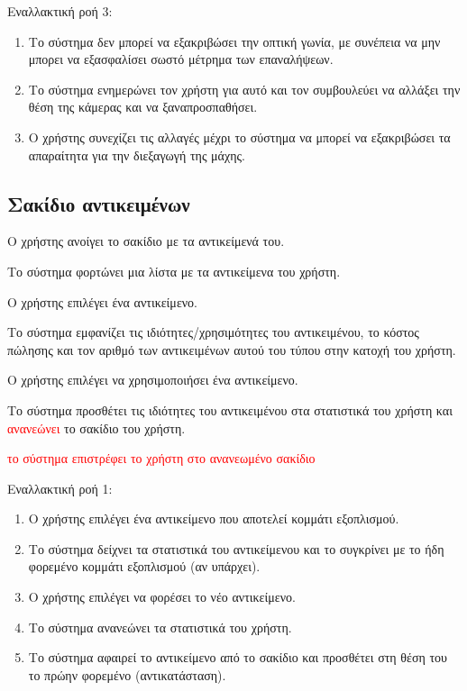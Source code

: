 Εναλλακτική ροή 3:
\begin{enumerate}[label=8.\alph*.,ref=8.\alph*]
\item Το σύστημα δεν μπορεί να εξακριβώσει την οπτική γωνία, με συνέπεια να μην μπορει να εξασφαλίσει σωστό μέτρημα των επαναλήψεων.
\item Το σύστημα ενημερώνει τον χρήστη για αυτό και τον συμβουλεύει να αλλάξει την θέση της κάμερας και να ξαναπροσπαθήσει. 
\item Ο χρήστης συνεχίζει τις αλλαγές μέχρι το σύστημα να μπορεί να εξακριβώσει τα απαραίτητα για την διεξαγωγή της μάχης.
\end{enumerate}

\newpage
\subsection{Σακίδιο αντικειμένων}
\label{sec:backpack}
\begin{enumerate}
\item Ο χρήστης ανοίγει το σακίδιο με τα αντικείμενά του.
\item Το σύστημα φορτώνει μια λίστα με τα αντικείμενα του χρήστη.
\item Ο χρήστης επιλέγει ένα αντικείμενο.
\item Το σύστημα εμφανίζει τις ιδιότητες/χρησιμότητες του αντικειμένου, το κόστος πώλησης και τον αριθμό των αντικειμένων αυτού του τύπου στην κατοχή του χρήστη.
\item Ο χρήστης επιλέγει να χρησιμοποιήσει ένα αντικείμενο.
\item Το σύστημα προσθέτει τις ιδιότητες του αντικειμένου στα στατιστικά του χρήστη και \textcolor{red}{ ανανεώνει }το σακίδιο του χρήστη.
\textcolor{red} { \item το σύστημα επιστρέφει το χρήστη στο ανανεωμένο σακίδιο}
\end{enumerate}

Εναλλακτική ροή 1:
\begin{enumerate}[label=3.\alph*.,ref=3.\alph*]
\item Ο χρήστης επιλέγει ένα αντικείμενο που αποτελεί κομμάτι εξοπλισμού.
\item Το σύστημα δείχνει τα στατιστικά του αντικείμενου και το συγκρίνει με το ήδη φορεμένο κομμάτι εξοπλισμού (αν υπάρχει).
\item O χρήστης επιλέγει να φορέσει το νέο αντικείμενο.
\item Το σύστημα ανανεώνει τα στατιστικά του χρήστη.
\item Το σύστημα αφαιρεί το αντικείμενο από το σακίδιο και προσθέτει στη θέση του το πρώην φορεμένο (αντικατάσταση).
\end{enumerate}

